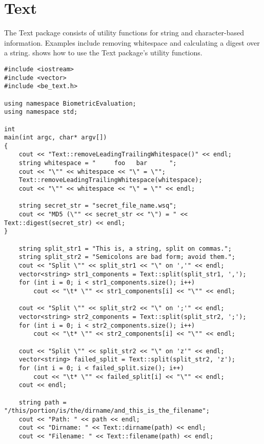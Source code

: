 %
%
\chapter{Text}
\label{chp-text}
The Text package consists of utility functions for string and character-based
information. Examples include removing whitespace and calculating a digest over
a string.  shows how to use the Text package's utility
functions.

\lstset{language=c++}
\begin{lstlisting}[caption={Using the Text Package}, label=textuse]
#include <iostream>
#include <vector>
#include <be_text.h>

using namespace BiometricEvaluation;
using namespace std;

int
main(int argc, char* argv[])
{
    cout << "Text::removeLeadingTrailingWhitespace()" << endl;
    string whitespace = "     foo   bar      ";
    cout << "\"" << whitespace << "\" = \"";
    Text::removeLeadingTrailingWhitespace(whitespace);
    cout << "\"" << whitespace << "\" = \"" << endl;

    string secret_str = "secret_file_name.wsq";
    cout << "MD5 (\"" << secret_str << "\") = " << Text::digest(secret_str) << endl;
}

    string split_str1 = "This is, a string, split on commas.";
    string split_str2 = "Semicolons are bad form; avoid them.";
    cout << "Split \"" << split_str1 << "\" on ','" << endl;
    vector<string> str1_components = Text::split(split_str1, ',');
    for (int i = 0; i < str1_components.size(); i++)
        cout << "\t* \"" << str1_components[i] << "\"" << endl;

    cout << "Split \"" << split_str2 << "\" on ';'" << endl;
    vector<string> str2_components = Text::split(split_str2, ';');
    for (int i = 0; i < str2_components.size(); i++)
        cout << "\t* \"" << str2_components[i] << "\"" << endl;

    cout << "Split \"" << split_str2 << "\" on 'z'" << endl;
    vector<string> failed_split = Text::split(split_str2, 'z');
    for (int i = 0; i < failed_split.size(); i++)
        cout << "\t* \"" << failed_split[i] << "\"" << endl;
    cout << endl;

    string path = "/this/portion/is/the/dirname/and_this_is_the_filename";
    cout << "Path: " << path << endl;
    cout << "Dirname: " << Text::dirname(path) << endl;
    cout << "Filename: " << Text::filename(path) << endl;

\end{lstlisting}

